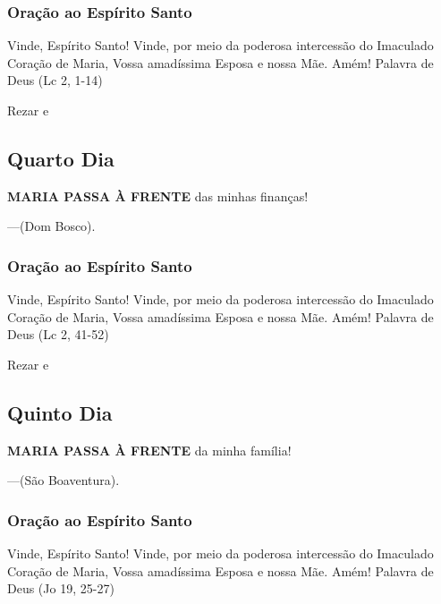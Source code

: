 \documentclass[a4paper,14pt]{extarticle} \usepackage[utf8]{inputenc}
\begin{document}
\subsubsection*{Oração ao Espírito Santo}
Vinde, Espírito Santo! Vinde, por meio da poderosa intercessão do
Imaculado Coração de Maria, Vossa amadíssima Esposa e nossa Mãe.
Amém!
Palavra de Deus (Lc 2, 1-14)

Rezar \textbf{} e \textbf{}


\subsection{Quarto Dia}

\noindent

\textbf{MARIA PASSA À FRENTE} das minhas finanças!


---(Dom Bosco).

\subsubsection*{Oração ao Espírito Santo}
Vinde, Espírito Santo! Vinde, por meio da poderosa intercessão do
Imaculado Coração de Maria, Vossa amadíssima Esposa e nossa Mãe.
Amém!
Palavra de Deus (Lc 2, 41-52)

Rezar \textbf{} e \textbf{}

\subsection{Quinto Dia}

\noindent

\textbf{MARIA PASSA À FRENTE} da minha família!


---(São Boaventura).

\subsubsection*{Oração ao Espírito Santo}
Vinde, Espírito Santo! Vinde, por meio da poderosa intercessão do
Imaculado Coração de Maria, Vossa amadíssima Esposa e nossa Mãe.
Amém!
Palavra de Deus (Jo 19, 25-27)
\end{document}
